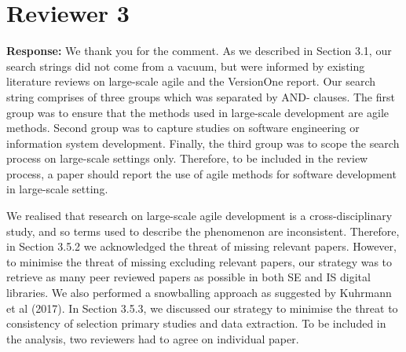 \documentclass[a4paper,twoside,11pt]{reviewresponse}
\begin{document}
\clearpage

\section{Reviewer 3}
\textbf{Response:}
We thank you for the comment. As we described in Section 3.1, our search strings did not come from a vacuum, but were informed by existing literature reviews on large-scale agile and the VersionOne report. Our search string comprises of three groups which was separated by AND- clauses. The first group was to ensure that the methods used in large-scale development are agile methods. Second group was to capture studies on software engineering or information system development. Finally, the third group was to scope the search process on large-scale settings only. Therefore, to be included in the review process, a paper should report the use of agile methods for software development in large-scale setting. 

We realised that research on large-scale agile development is a cross-disciplinary study, and so terms used to describe the phenomenon are inconsistent. Therefore, in Section 3.5.2 we acknowledged the threat of missing relevant papers. However, to minimise the threat of missing excluding relevant papers, our strategy was to retrieve as many peer reviewed papers as possible in both SE and IS digital libraries. We also performed a snowballing approach as suggested by Kuhrmann et al (2017). In Section 3.5.3, we discussed our strategy to minimise the threat to consistency of selection primary studies and data extraction. To be included in the analysis, two reviewers had to agree on individual paper.
\end{document}
